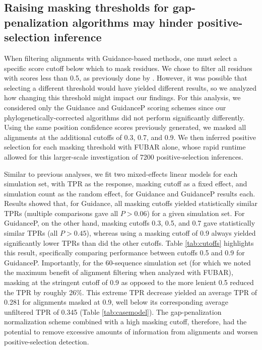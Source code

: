 \documentclass[10pt]{article}
\begin{document}
\subsection*{Raising masking thresholds for gap-penalization algorithms may hinder positive-selection inference}

When filtering alignments with Guidance-based methods, one must select a specific score cutoff below which to mask residues. We chose to filter all residues with scores less than 0.5, as previously done by \citet{Jordan2012}. However, it was possible that selecting a different threshold would have yielded different results, so we analyzed how changing this threshold might impact our findings. For this analysis, we considered only the Guidance and GuidanceP scoring schemes since our phylogenetically-corrected algorithms did not perform significantly differently. Using the same position confidence scores previously generated, we masked all alignments at the additional cutoffs of 0.3, 0.7, and 0.9. We then inferred positive selection for each masking threshold with FUBAR alone, whose rapid runtime allowed for this larger-scale investigation of 7200 positive-selection inferences.

Similar to previous analyses, we fit two mixed-effects linear models for each simulation set, with TPR as the response, masking cutoff as a fixed effect, and simulation count as the random effect, for Guidance and GuidanceP results each. Results showed that, for Guidance, all masking cutoffs yielded statistically similar TPRs (multiple comparisons gave all $P>0.06$) for a given simulation set. For GuidanceP, on the other hand, masking cutoffs 0.3, 0.5, and 0.7 gave statistically similar TPRs (all $P>0.45$), whereas using a masking cutoff of 0.9 always yielded significantly lower TPRs than did the other cutoffs. Table \ref{tab:cutoffs} highlights this result, specifically comparing performance between cutoffs 0.5 and 0.9 for GuidanceP. Importantly, for the 60-sequence simulation set (for which we noted the maximum benefit of alignment filtering when analyzed with FUBAR), masking at the stringent cutoff of 0.9 as opposed to the more lenient 0.5 reduced the TPR by roughly 26\%. This extreme TPR decrease yielded an average TPR of 0.281 for alignments masked at 0.9, well below its corresponding average unfiltered TPR of 0.345 (Table \ref{tab:casemodel}). The gap-penalization normalization scheme combined with a high masking cutoff, therefore, had the potential to remove excessive amounts of information from alignments and worsen positive-selection detection. 
\end{document}
